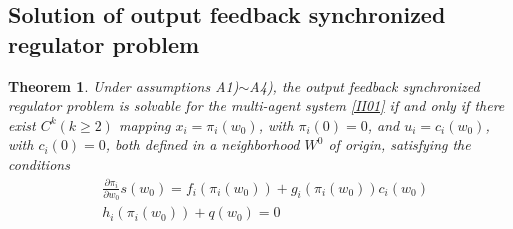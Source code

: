 \documentclass[onecolumn,a4paper,12pt]{article}
\newtheorem{theorem}{Theorem}
\numberwithin{equation}{section}
\begin{document}
\subsection{Solution of output feedback synchronized regulator problem}
\begin{theorem}\label{th02}
Under assumptions A1)$\sim$A4), the output feedback synchronized regulator problem is solvable for the multi-agent system \eqref{II01} if and only if there exist $C^k(k\ge 2)$ mapping $x_i=\pi_i(w_0)$, with $\pi_i(0)=0$, and $u_i=c_i(w_0)$, with $c_i(0)=0$, both defined in a neighborhood $W^0$ of origin, satisfying the conditions
\setcounter{equation}{8}
\begin{subequations} \label{III09}
\begin{align}
 \label{III09a} &\frac{\partial \pi_i}{\partial w_0} s(w_0) = f_i(\pi_i(w_0))+g_i(\pi_i(w_0))c_i(w_0) \\
 \label{III09b} &h_i(\pi_i(w_0))+q(w_0)=0
\end{align}
\end{subequations}
\end{theorem}
\end{document}
